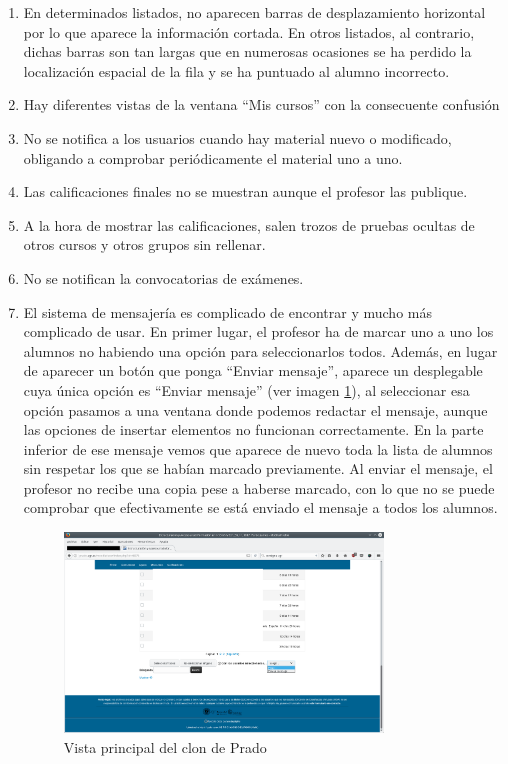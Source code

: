 \begin{enumerate}
\item En determinados listados, no aparecen barras de desplazamiento horizontal por lo que aparece la información cortada. En otros listados, al contrario, dichas barras son tan largas que en numerosas ocasiones se ha perdido la localización espacial de la fila y se ha puntuado al alumno incorrecto.

\item Hay diferentes vistas de la ventana ``Mis cursos'' con la consecuente confusión

\item No se notifica a los usuarios cuando hay material nuevo o modificado, obligando a comprobar periódicamente el material uno a uno.

\item Las calificaciones finales no se muestran aunque el profesor las publique.

\item A la hora de mostrar las calificaciones, salen trozos de pruebas ocultas de otros cursos y otros grupos sin rellenar.

\item No se notifican la convocatorias de exámenes.

\item El sistema de mensajería es complicado de encontrar y mucho más complicado de usar. En primer lugar, el profesor ha de marcar uno a uno los alumnos no habiendo una opción para seleccionarlos todos. Además, en lugar de aparecer un botón que ponga  ``Enviar mensaje'', aparece un desplegable cuya única opción es ``Enviar mensaje'' (ver imagen \ref{fig:pantallazoPradoenviarMensaje}), al seleccionar esa opción pasamos a una ventana donde podemos redactar el mensaje, aunque las opciones de insertar elementos no funcionan correctamente. En la parte inferior de ese mensaje vemos que aparece de nuevo toda la lista de alumnos sin respetar los que se habían marcado previamente. Al enviar el mensaje, el profesor no recibe una copia pese a haberse marcado, con lo que no se puede comprobar que efectivamente se está enviado el mensaje a todos los alumnos.

\begin{figure}[h!]
\centering
\includegraphics[width=0.8\textwidth]{../screenshots/pantallazoPradoenviarMensaje}
\caption{Vista principal del clon de Prado}
\label{fig:pantallazoPradoenviarMensaje}
\end{figure}


\end{enumerate}
